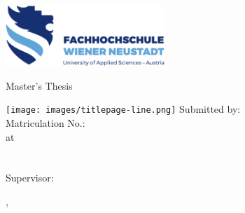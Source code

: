 
\makeatletter

\begin{titlepage}

	\includegraphics[width=6cm]{images/fhwn-logo-neu-ohneSchutzraum.png}

	\begin{sffamily}
		\vspace{70pt}
		{\noindent \linespread{1.3} \color{header-blue} \Huge \textbf{\@title} \par }
		\vspace{10pt}
		{\noindent\Large Master's Thesis \par}
		\vspace{15pt}
		\hspace{-35mm}
		\texttt{[image: images/titlepage-line.png]}
		\vspace{15pt}
		\tabto{2cm}Submitted by:\tabto{7cm}\textbf{\@author} \\
		\tabto{2cm}Matriculation No.:\tabto{7cm}\textbf{\matriculationNumber} \\
		\vspace{15pt}
		\tabto{2cm}at\tabto{7cm}\textbf{\study}\\
		\tabto{7cm}\textbf{\studyprogram}\\
		\tabto{7cm}\textbf{\masterdescription}\\
		\vspace{15pt}
		\tabto{2cm}Supervisor:\tabto{7cm}\textbf{\advisor}

		\vfill

		\place, \thesisdate
	\end{sffamily}

\end{titlepage}

\makeatother

